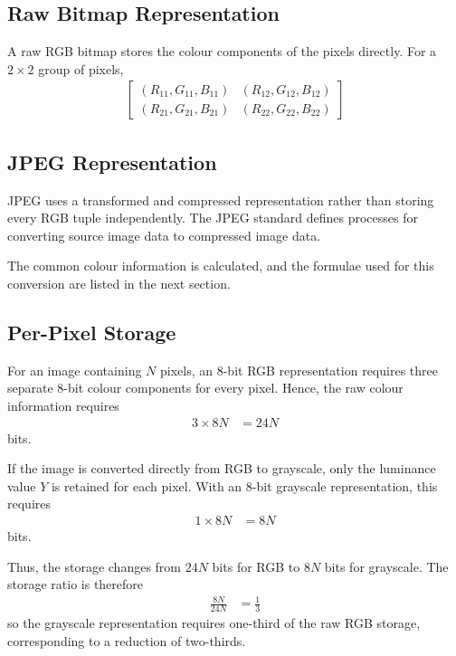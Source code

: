 \subsection{Raw Bitmap Representation}

A raw RGB bitmap stores the colour components of the pixels directly.
For a $2\times2$ group of pixels,
\begin{align}
\begin{bmatrix}
(R_{11},G_{11},B_{11}) & (R_{12},G_{12},B_{12})\\
(R_{21},G_{21},B_{21}) & (R_{22},G_{22},B_{22})
\end{bmatrix}\label{eq:raw_rgb_2x2}
\end{align}

\vspace*{\baselineskip}

\subsection{JPEG Representation}

JPEG uses a transformed and compressed representation rather than
storing every RGB tuple independently. The JPEG standard defines processes
for converting source image data to compressed image data.

The common colour information is calculated, and the formulae used for
this conversion are listed in the next section.

\vspace*{\baselineskip}

\subsection{Per-Pixel Storage}

For an image containing $N$ pixels, an 8-bit RGB representation requires
three separate 8-bit colour components for every pixel. Hence, the raw
colour information requires
\begin{align}
3\times8N&=24N\label{eq:rgb_storage_bits}
\end{align}
bits.

If the image is converted directly from RGB to grayscale, only the
luminance value $Y$ is retained for each pixel. With an 8-bit grayscale
representation, this requires
\begin{align}
1\times8N&=8N\label{eq:grayscale_storage_bits}
\end{align}
bits.

Thus, the storage changes from $24N$ bits for RGB to $8N$ bits for
grayscale. The storage ratio is therefore
\begin{align}
\frac{8N}{24N}&=\frac{1}{3}\label{eq:rgb_grayscale_ratio}
\end{align}
so the grayscale representation requires one-third of the raw RGB
storage, corresponding to a reduction of two-thirds.

